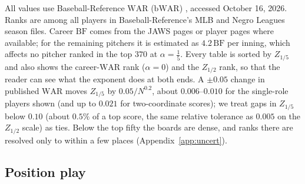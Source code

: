 \documentclass[11pt,letterpaper]{article}
\theoremstyle{plain}
\theoremstyle{definition}
\theoremstyle{remark}
\newcommand{\WAR}{\mathrm{WAR}}
\newcommand{\BF}{\mathrm{BF}}
\begin{document}
All values use Baseball-Reference $\WAR$ ($\mathrm{bWAR}$) \cite{bbref2026}, accessed October 16, 2026. Ranks are among all players in Baseball-Reference's MLB and Negro Leagues season files. Career $\BF$ comes from the JAWS pages or player pages where available; for the remaining pitchers it is estimated as $4.2\,\BF$ per inning, which affects no pitcher ranked in the top $370$ at $\alpha = \tfrac15$. Every table is sorted by $Z_{1/5}$ and also shows the career-$\WAR$ rank ($\alpha = 0$) and the $Z_{1/2}$ rank, so that the reader can see what the exponent does at both ends. A $\pm 0.05$ change in published $\WAR$ moves $Z_{1/5}$ by $0.05/N^{0.2}$, about $0.006$--$0.010$ for the single-role players shown (and up to $0.021$ for two-coordinate scores); we treat gaps in $Z_{1/5}$ below $0.10$ (about $0.5\%$ of a top score, the same relative tolerance as $0.005$ on the $Z_{1/2}$ scale) as ties. Below the top fifty the boards are dense, and ranks there are resolved only to within a few places (Appendix~\ref{app:uncert}).

\subsection{Position play}
\label{sec:hitters}
\end{document}
